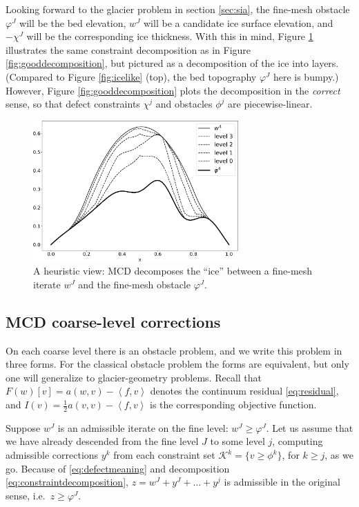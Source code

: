 \documentclass[letterpaper,final,12pt,reqno]{amsart}
\theoremstyle{claim}
\newcommand{\ip}[2]{\left<#1,#2\right>}
\numberwithin{equation}{section}
\numberwithin{figure}{section}
\numberwithin{table}{section}
\numberwithin{theorem}{section}
\begin{document}
Looking forward to the glacier problem in section \ref{sec:sia}, the fine-mesh obstacle $\varphi^J$ will be the bed elevation, $w^J$ will be a candidate ice surface elevation, and $-\chi^J$ will be the corresponding ice thickness.  With this in mind, Figure \ref{fig:icelikedecomposition} illustrates the same constraint decomposition as in Figure \ref{fig:gooddecomposition}, but pictured as a decomposition of the ice into layers.  (Compared to Figure \ref{fig:icelike} (top), the bed topography $\varphi^J$ here is bumpy.)  However, Figure \ref{fig:gooddecomposition} plots the decomposition in the \emph{correct} sense, so that defect constraints $\chi^j$ and obstacles $\phi^j$ are piecewise-linear.

\begin{figure}
\includegraphics[width=0.7\textwidth]{fixfigs/icedec_defect.pdf}
\caption{A heuristic view: MCD decomposes the ``ice'' between a fine-mesh iterate $w^J$ and the fine-mesh obstacle $\varphi^J$.}
\label{fig:icelikedecomposition}
\end{figure}

\subsection*{MCD coarse-level corrections}  On each coarse level there is an obstacle problem, and we write this problem in three forms.  For the classical obstacle problem the forms are equivalent, but only one will generalize to glacier-geometry problems.  Recall that $F(w)[v] = a(w,v) - \ip{f}{v}$ denotes the continuum residual \eqref{eq:residual}, and $I(v) = \frac{1}{2} a(v,v) - \ip{f}{v}$ is the corresponding objective function.

Suppose $w^J$ is an admissible iterate on the fine level: $w^J\ge \varphi^J$.  Let us assume that we have already descended from the fine level $J$ to some level $j$, computing admissible corrections $y^k$ from each constraint set $\mathcal{K}^k=\{v\ge \phi^k\}$, for $k\ge j$, as we go.  Because of \eqref{eq:defectmeaning} and decomposition \eqref{eq:constraintdecomposition}, $z = w^J+y^J+\dots+y^j$ is admissible in the original sense, i.e.~$z\ge \varphi^J$.
\end{document}
